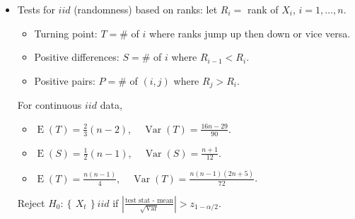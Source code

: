 \documentclass[paper=a4,fontsize=2.89mm]{scrartcl}
\DeclareMathOperator{\Var}{Var}
\DeclareMathOperator{\E}{E}
\newcommand\abs[1]{\left| #1 \right|}
\newcommand\set[1]{\left\{\, #1 \,\right\}}
\begin{document}
\begin{multicols}{3}
\begin{itemize}
\item Tests for $iid$ (randomness) based on ranks: let $R_i =$ rank of $X_i$, $i=1,\dots,n$.
	\begin{itemize}
	\item Turning point: $T = \#$ of $i$ where ranks jump up then down or vice versa.
	\item Positive differences: $S = \#$ of $i$ where $R_{i-1} < R_i$.
	\item Positive pairs: $P = \#$ of $(i,j)$ where $R_j > R_i$.
	\end{itemize}
For continuous $iid$ data,
	\begin{itemize}
	\item $\E(T) = \frac{2}{3}(n-2), \quad \Var(T) = \frac{16n-29}{90}$.
	\item $\E(S) = \frac{1}{2}(n-1), \quad \Var(S) = \frac{n+1}{12}$.
	\item $\E(T) = \frac{n(n-1)}{4}, \quad \Var(T) = \frac{n(n-1)(2n+5)}{72}$.
	\end{itemize}
Reject $H_0: \set{X_t} iid$ if $\abs{\frac{\text{test stat - mean}}{\sqrt{\Var}}} > z_{1-\alpha/2}.$
\end{itemize}


\end{multicols}
\end{document}
